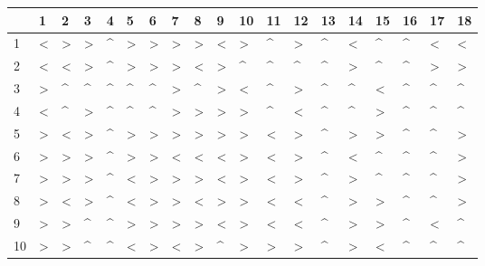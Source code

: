 \begin{tabular}{lllllllllllllllllll}
\toprule
{} & 1  & 2  & 3  & 4  & 5  & 6  & 7  & 8  & 9  & 10 & 11 & 12 & 13 & 14 & 15 & 16 & 17 & 18 \\
\midrule
1   &  < &  > &  > &  \textasciicircum  &  > &  > &  > &  > &  < &  > &  \textasciicircum  &  > &  \textasciicircum  &  < &  \textasciicircum  &  \textasciicircum  &  < &  < \\
2   &  < &  < &  > &  \textasciicircum  &  > &  > &  > &  < &  > &  \textasciicircum  &  \textasciicircum  &  \textasciicircum  &  \textasciicircum  &  > &  \textasciicircum  &  \textasciicircum  &  > &  > \\
3   &  > &  \textasciicircum  &  \textasciicircum  &  \textasciicircum  &  \textasciicircum  &  \textasciicircum  &  > &  \textasciicircum  &  > &  < &  \textasciicircum  &  > &  \textasciicircum  &  \textasciicircum  &  < &  \textasciicircum  &  \textasciicircum  &  \textasciicircum  \\
4   &  < &  \textasciicircum  &  > &  \textasciicircum  &  \textasciicircum  &  \textasciicircum  &  > &  > &  > &  > &  \textasciicircum  &  < &  \textasciicircum  &  \textasciicircum  &  > &  \textasciicircum  &  \textasciicircum  &  \textasciicircum  \\
5   &  > &  < &  > &  \textasciicircum  &  > &  > &  > &  > &  > &  > &  < &  > &  \textasciicircum  &  > &  > &  \textasciicircum  &  \textasciicircum  &  > \\
6   &  > &  > &  > &  \textasciicircum  &  > &  > &  < &  < &  < &  > &  < &  > &  \textasciicircum  &  < &  \textasciicircum  &  \textasciicircum  &  \textasciicircum  &  > \\
7   &  > &  > &  > &  \textasciicircum  &  < &  > &  > &  > &  < &  > &  < &  > &  \textasciicircum  &  > &  \textasciicircum  &  \textasciicircum  &  \textasciicircum  &  > \\
8   &  > &  < &  > &  \textasciicircum  &  < &  > &  > &  < &  > &  > &  < &  < &  \textasciicircum  &  > &  > &  \textasciicircum  &  \textasciicircum  &  > \\
9   &  > &  > &  \textasciicircum  &  \textasciicircum  &  > &  > &  > &  > &  < &  > &  < &  < &  \textasciicircum  &  > &  > &  \textasciicircum  &  < &  \textasciicircum  \\
10  &  > &  > &  \textasciicircum  &  \textasciicircum  &  < &  > &  < &  > &  \textasciicircum  &  > &  > &  > &  \textasciicircum  &  > &  < &  \textasciicircum  &  \textasciicircum  &  \textasciicircum  \\

\end{tabular}
